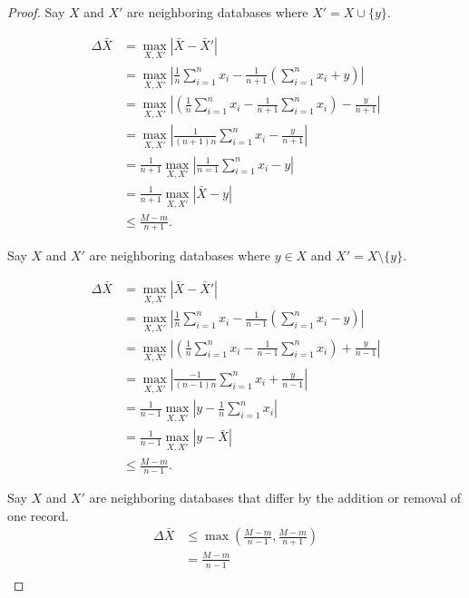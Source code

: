 \documentclass[11pt, oneside]{article}    %
\begin{document}
    \begin{proof}
		Say $X$ and $X'$ are neighboring databases where $X' = X \cup \{y\}$.

        \begin{align*}
            \Delta{\bar{X}} &= \max_{X,X'} \left\vert \bar{X} - \bar{X}' \right\vert \\
            &=  \max_{X,X'} \left\vert \frac{1}{n} \sum^{n}_{i=1} x_i - \frac{1}{n + 1} \left(\sum^{n}_{i=1} x_i + y\right)  \right\vert \\
            &=  \max_{X,X'} \left\vert \left(\frac{1}{n} \sum^{n}_{i=1} x_i - \frac{1}{n + 1} \sum^{n}_{i=1} x_i \right) - \frac{y}{n + 1}  \right\vert \\
            &=  \max_{X,X'} \left\vert \frac{1}{(n + 1)n} \sum^{n}_{i=1} x_i - \frac{y}{n + 1}  \right\vert \\
            &=  \frac{1}{n + 1} \max_{X,X'} \left\vert \frac{1}{n=1} \sum^{n}_{i=1} x_i - y  \right\vert \\
            &=  \frac{1}{n + 1} \max_{X,X'} \left\vert \bar{X} - y  \right\vert \\
            &\le \frac{M-m}{n + 1}.
        \end{align*}

        Say $X$ and $X'$ are neighboring databases where $y \in X$ and $X' = X \setminus \{y\}$.

        \begin{align*}
            \Delta{\bar{X}} &= \max_{X,X'} \left\vert \bar{X} - \bar{X}' \right\vert \\
            &=  \max_{X,X'} \left\vert \frac{1}{n} \sum^{n}_{i=1} x_i - \frac{1}{n - 1} \left(\sum^{n}_{i=1} x_i - y\right)  \right\vert \\
            &=  \max_{X,X'} \left\vert \left(\frac{1}{n} \sum^{n}_{i=1} x_i - \frac{1}{n - 1} \sum^{n}_{i=1} x_i \right) + \frac{y}{n - 1}  \right\vert \\
            &=  \max_{X,X'} \left\vert \frac{-1}{(n - 1)n} \sum^{n}_{i=1} x_i + \frac{y}{n - 1}  \right\vert \\
            &=  \frac{1}{n - 1} \max_{X,X'} \left\vert y - \frac{1}{n} \sum^{n}_{i=1} x_i  \right\vert \\
            &=  \frac{1}{n - 1} \max_{X,X'} \left\vert y - \bar{X}  \right\vert \\
            &\le \frac{M-m}{n - 1}.
        \end{align*}

        Say $X$ and $X'$ are neighboring databases that differ by the addition or removal of one record.
        \begin{align*}
            \Delta{\bar{X}} &\le \max \left( \frac{M - m}{n - 1}, \frac{M - m}{n + 1} \right) \\
            &= \frac{M - m}{n - 1} \\
        \end{align*}

    \end{proof}
\end{document}
